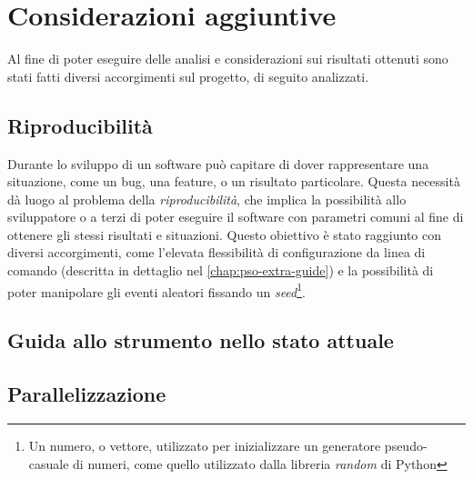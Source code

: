 \section{Considerazioni aggiuntive}
Al fine di poter eseguire delle analisi e considerazioni sui risultati ottenuti sono stati fatti diversi accorgimenti sul progetto, di seguito analizzati.

\subsection{Riproducibilità}
Durante lo sviluppo di un software può capitare di dover rappresentare una situazione, come un bug, una feature, o un risultato particolare. Questa necessità dà luogo al problema della \textit{riproducibilità}, che implica la possibilità allo sviluppatore o a terzi di poter eseguire il software con parametri comuni al fine di ottenere gli stessi risultati e situazioni. Questo obiettivo è stato raggiunto con diversi accorgimenti, come l'elevata flessibilità di configurazione da linea di comando (descritta in dettaglio nel \autoref{chap:pso-extra-guide}) e la possibilità di poter manipolare gli eventi aleatori fissando un \textit{seed}\footnote{Un numero, o vettore, utilizzato per inizializzare un generatore pseudo-casuale di numeri, come quello utilizzato dalla libreria \textit{random} di Python}.

\subsection{Guida allo strumento nello stato attuale}
\label{chap:pso-extra-guide}

\subsection{Parallelizzazione}

